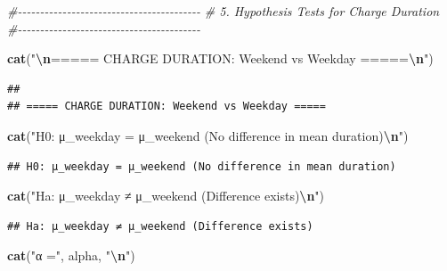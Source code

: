 \documentclass[
  12pt,
]{article}
\newenvironment{Shaded}{\begin{snugshade}}{\end{snugshade}}
\newcommand{\CommentTok}[1]{\textcolor[rgb]{0.56,0.35,0.01}{\textit{#1}}}
\newcommand{\FunctionTok}[1]{\textcolor[rgb]{0.13,0.29,0.53}{\textbf{#1}}}
\newcommand{\NormalTok}[1]{#1}
\newcommand{\SpecialCharTok}[1]{\textcolor[rgb]{0.81,0.36,0.00}{\textbf{#1}}}
\newcommand{\StringTok}[1]{\textcolor[rgb]{0.31,0.60,0.02}{#1}}
\begin{document}
\begin{Shaded}
\begin{Highlighting}[]
\CommentTok{\#{-}{-}{-}{-}{-}{-}{-}{-}{-}{-}{-}{-}{-}{-}{-}{-}{-}{-}{-}{-}{-}{-}{-}{-}{-}{-}{-}{-}{-}{-}{-}{-}{-}{-}{-}{-}{-}{-}{-}{-}{-}}
\CommentTok{\# 5. Hypothesis Tests for Charge Duration}
\CommentTok{\#{-}{-}{-}{-}{-}{-}{-}{-}{-}{-}{-}{-}{-}{-}{-}{-}{-}{-}{-}{-}{-}{-}{-}{-}{-}{-}{-}{-}{-}{-}{-}{-}{-}{-}{-}{-}{-}{-}{-}{-}{-}}

\FunctionTok{cat}\NormalTok{(}\StringTok{"}\SpecialCharTok{\textbackslash{}n}\StringTok{===== CHARGE DURATION: Weekend vs Weekday =====}\SpecialCharTok{\textbackslash{}n}\StringTok{"}\NormalTok{)}
\end{Highlighting}
\end{Shaded}

\begin{verbatim}
## 
## ===== CHARGE DURATION: Weekend vs Weekday =====
\end{verbatim}

\begin{Shaded}
\begin{Highlighting}[]
\FunctionTok{cat}\NormalTok{(}\StringTok{"H0: μ\_weekday = μ\_weekend (No difference in mean duration)}\SpecialCharTok{\textbackslash{}n}\StringTok{"}\NormalTok{)}
\end{Highlighting}
\end{Shaded}

\begin{verbatim}
## H0: μ_weekday = μ_weekend (No difference in mean duration)
\end{verbatim}

\begin{Shaded}
\begin{Highlighting}[]
\FunctionTok{cat}\NormalTok{(}\StringTok{"Ha: μ\_weekday ≠ μ\_weekend (Difference exists)}\SpecialCharTok{\textbackslash{}n}\StringTok{"}\NormalTok{)}
\end{Highlighting}
\end{Shaded}

\begin{verbatim}
## Ha: μ_weekday ≠ μ_weekend (Difference exists)
\end{verbatim}

\begin{Shaded}
\begin{Highlighting}[]
\FunctionTok{cat}\NormalTok{(}\StringTok{"α ="}\NormalTok{, alpha, }\StringTok{"}\SpecialCharTok{\textbackslash{}n}\StringTok{"}\NormalTok{)}
\end{Highlighting}
\end{Shaded}
\end{document}
